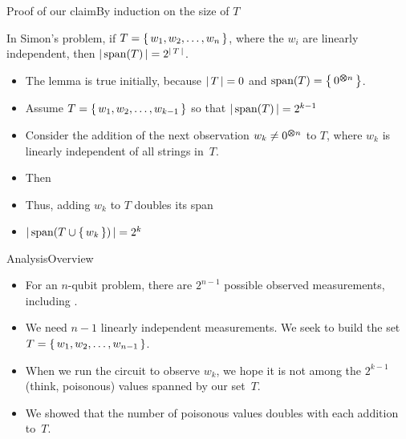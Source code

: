 \begin{frame}{Proof of our claim}{By induction on the size of $T$}

\begin{lemma}
In Simon's problem, if $T=\left\{\,w_{1}, w_{2},\ldots,w_{n}\,\right\}$, where the $w_{i}$ are linearly independent, then ${|\,{\mbox{span}(T)}\,|}=2^{{|\,T\,|}}$.
\end{lemma}
\begin{itemize}
    \item The lemma is true initially, because ${|\,T\,|}=0$ and ${\mbox{span}(T)}=\left\{\,0^{\bm{\otimes} n}\,\right\}$.
    \item Assume $T=\left\{\,w_{1},w_{2},\ldots,w_{k-1}\,\right\}$ so that ${|\,{\mbox{span}(T)}\,|}=2^{k-1}$
    \item Consider the addition of the next observation $w_{k}\not=0^{\bm{\otimes} n}$ to $T$, where $w_k$ is linearly independent of all strings in~$T$.
    \item Then 
    \item Thus, adding $w_{k}$ to $T$ doubles its span
    \item ${|\,{\mbox{span}(T \cup \left\{\,w_{k}\,\right\})}\,|}=2^k$ \QED{}
\end{itemize}
    
\end{frame}

\begin{frame}{Analysis}{Overview}

\begin{itemize}
    \item<1-> For an $n$-qubit problem, there are $2^{n-1}$ possible observed measurements, including .
    \item<2-> We need $n-1$ linearly independent measurements.  We seek to build the set $T=\left\{\,w_{1},w_{2},\ldots, w_{n-1}\,\right\}$.
    \item<3-> When we run the circuit to observe $w_{k}$, we hope it is not among the $2^{k-1}$ (think, poisonous) values spanned by our set~$T$.
    \item<4-> We showed that the number of poisonous values doubles with each addition to~$T$.
\end{itemize}
    
\end{frame}

